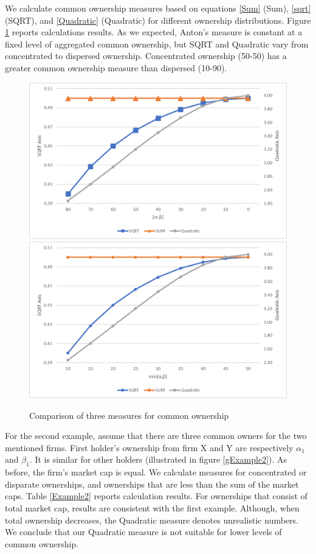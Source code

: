 \begin{appendices}
\begin{figure}[htbp]
{
									}
									\end{figure}		
We  calculate common ownership measures based on equations \ref{Sum} (Sum), \ref{sqrt} (SQRT), and \ref{Quadratic} (Quadratic) for different ownership distributions. Figure \ref{example1Results}  reports calculations results. As we expected, Anton's measure is constant at a fixed level of aggregated common ownership, but SQRT and Quadratic vary from concentrated to dispersed ownership.  Concentrated ownership (50-50) has a greater common ownership measure than dispersed (10-90).
				
				\begin{figure}[htbp]
					\caption{ {Comparison of three measures for common ownership}}
					\label{example1Results}
					\includegraphics[width=0.47\linewidth]{Elements/1.png}
					\includegraphics[width=0.47\linewidth]{Elements/2.png}
				\end{figure}

For the second example, assume that there are three common owners for the two mentioned firms. First holder's ownership from firm X and Y are respectively $\alpha_1$ and $\beta_1$. It is similar for other holders (illustrated in figure \ref{gExample2}). As before, the firm's market cap is equal. We calculate measures for concentrated or disparate ownerships, and ownerships that are less than the sum of the market caps. Table \ref{Example2} reports calculation results. For ownerships that consist of total market cap,  results are consistent with the first example. Although, when total ownership decreases, the Quadratic measure denotes unrealistic numbers. We conclude that our Quadratic measure is not suitable for lower levels of common ownership.
				

\end{appendices}
